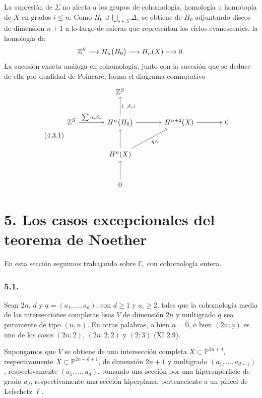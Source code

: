 La supresión de $\Sigma$ no afecta a los grupos de cohomología,
homología u homotopía de $X$ en grados $i\leq n$. Como
$H_0\cup\bigcup_{s\in S}\Delta_s$ se obtiene de $H_0$ adjuntando discos
de dimensión $n+1$ a lo largo de esferas que representan los ciclos
evanescentes, la homología da
\[
\mathbb Z^S\longrightarrow
H_n\bigl(\sisi{V_0}{H_0}\bigr)
\longrightarrow H_n(X)\longrightarrow0.
\]
La sucesión exacta análoga en cohomología, junto con la sucesión que se
deduce de ella por dualidad de Poincaré, forma el diagrama conmutativo
\begin{equation}\tag{4.3.1}
\begin{tikzcd}[row sep=large,column sep=large]
{} & \mathbb Z^S & {} & {} \\
\mathbb Z^S \arrow[r,"{\sum n_s\delta_s}"] &
H^n\bigl(\sisi{V_0}{H_0}\bigr)
  \arrow[u,"{(\ ,\delta_s)}"'] \arrow[r] &
H^{n+2}(X) \arrow[r] & 0 \\
{} & H^n(X) \arrow[u] \arrow[ur,"{\sisi{\eta\Lambda}{\eta\wedge}}"'] & {} & {} \\
{} & 0 \arrow[u] & {} & {}
\end{tikzcd}
\end{equation}

\pageoriginale

\section*{5. Los casos excepcionales del teorema de Noether}

En esta sección seguimos trabajando sobre $\mathbb C$, con cohomología
entera.

\subsubsection*{5.1.}

Sean $2n$, $d$ y $\underline a=(a_1,\ldots,a_d)$, con $d\geq1$ y
$a_i\geq2$, tales que la cohomología media de las intersecciones
completas lisas $V$ de dimensión $2n$ y multigrado $\underline a$ sea
puramente de tipo $(n,n)$. En otras palabras, o bien $n=0$, o bien
$(2n;\underline a)$ es uno de los casos $(2n;2)$, $(2n;2,2)$ y $(2;3)$
(XI 2.9).

Supongamos que $V$ se obtiene de una intersección completa
$X\subset\mathbb P^{2n+d}$, respectivamente
$X\subset\mathbb P^{2n+d+1}$, de dimensión $2n+1$ y multigrado
$(a_1,\ldots,a_{d-1})$, respectivamente $(a_1,\ldots,a_d)$, tomando
una sección por una hipersuperficie de grado $a_d$, respectivamente una
sección hiperplana, perteneciente a un pincel de Lefschetz $\ell$.

